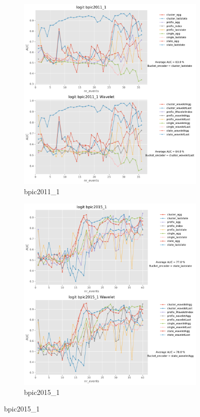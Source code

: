 \documentclass[twoside,11pt]{Latex/Classes/PhDthesisPSnPDF}
\begin{document}
\begin{figure}[!htbp] %
	
	\begin{subfigure}{0.48\textwidth}
		\includegraphics[width=\linewidth]{images/wavelet/graphs2logit/bpic2011_1.pdf}
		\caption{bpic2011\_1} 
	\end{subfigure}\hspace*{\fill}
	\begin{subfigure}{0.48\textwidth}
		\includegraphics[width=\linewidth]{images/wavelet/graphs2logit/bpic2015_1.pdf}
		\caption{bpic2015\_1}
	\end{subfigure}
	

\end{figure}
\end{document}
